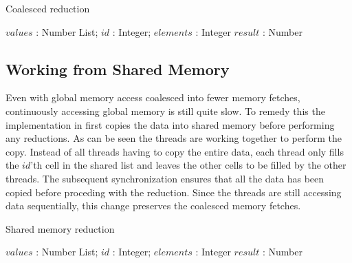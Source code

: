 
\begin{algorithm}
  \caption{Coalesced reduction}
  \label{alg:coalescedReduct}
  \begin{algorithmic}
              {$values$ : Number List; $id$ : Integer; $elements$ : Integer}
              {$result$ : Number}
              {
                  \ENDIF
                  \SYNC
                \ENDWHILE
                \ENDIF
              }
  \end{algorithmic}
\end{algorithm}



\subsection{Working from Shared Memory}\label{sec:usingSharedMem}

Even with global memory access coalesced into fewer memory fetches, continuously
accessing global memory is still quite slow. To remedy this the implementation
in  first copies the data into shared memory before
performing any reductions. As can be seen the threads are working together to
perform the copy. Instead of all threads having to copy the entire data, each
thread only fills the $id$'th cell in the shared list and leaves the other cells
to be filled by the other threads. The subsequent synchronization ensures that
all the data has been copied before proceding with the reduction. Since the
threads are still accessing data sequentially, this change preserves the
coalesced memory fetches.

\begin{algorithm}
  \caption{Shared memory reduction}
  \label{alg:sharedReduct}
  \begin{algorithmic}
              {$values$ : Number List; $id$ : Integer; $elements$ : Integer}
              {$result$ : Number}
              {
                \SYNC
                  \ENDIF
                  \SYNC
                \ENDWHILE
                \ENDIF
              }
  \end{algorithmic}
\end{algorithm}

